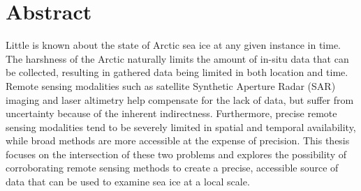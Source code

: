 
\chapter*{Abstract}

\indent Little is known about the state of Arctic sea ice at any given instance in time. The harshness of the Arctic naturally limits the amount of in-situ data that can be collected, resulting in gathered data being limited in both location and time. Remote sensing modalities such as satellite Synthetic Aperture Radar (SAR) imaging and laser altimetry help compensate for the lack of data, but suffer from uncertainty because of the inherent indirectness. Furthermore, precise remote sensing modalities tend to be severely limited in spatial and temporal availability, while broad methods are more accessible at the expense of precision. This thesis focuses on the intersection of these two problems and explores the possibility of corroborating remote sensing methods to create a precise, accessible source of data that can be used to examine sea ice at a local scale.
\par

